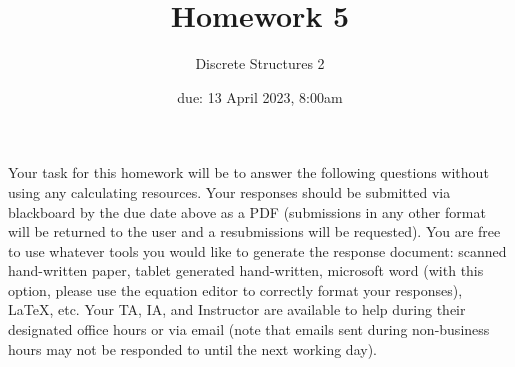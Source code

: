 \documentclass[11pt, oneside]{article}   	%
\title{Homework 5}
\author{Discrete Structures 2}
\date{due: 13 April 2023, 8:00am}							%
\begin{document}
\maketitle

Your task for this homework will be to answer the following questions without using any calculating resources. 
Your responses should be submitted via blackboard by the due date above as a PDF (submissions in any other format will be returned to the user and a resubmissions will be requested). 
You are free to use whatever tools you would like to generate the response document: 
scanned hand-written paper, 
tablet generated hand-written, 
microsoft word (with this option, please use the equation editor to correctly format your responses), 
\LaTeX, etc.
Your TA, IA, and Instructor are available to help during their designated office hours or via email 
(note that emails sent during non-business hours may not be responded to until the next working day). 
\end{document}
